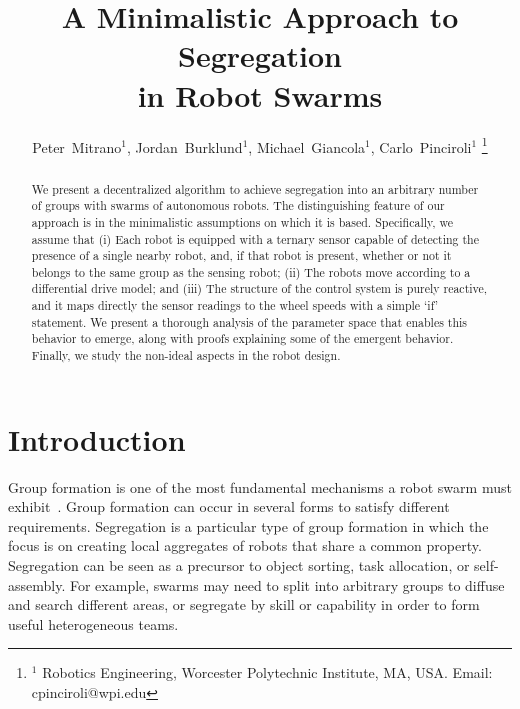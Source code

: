 \documentclass[letterpaper, 10 pt, conference]{ieeeconf}
\begin{document}
\title{\LARGE \bf
A Minimalistic Approach to Segregation\\
in Robot Swarms}

\author{
  Peter~Mitrano$^{1}$,
  Jordan~Burklund$^{1}$,
  Michael~Giancola$^{1}$,
  Carlo~Pinciroli$^{1}$%
  \thanks{$^{1}$ Robotics Engineering, Worcester Polytechnic Institute, MA, USA. Email: {\sf cpinciroli@wpi.edu}}%
}

\maketitle
\thispagestyle{empty}
\pagestyle{empty}

\begin{abstract}
  We present a decentralized algorithm to achieve segregation into an arbitrary
  number of groups with swarms of autonomous robots. The distinguishing feature
  of our approach is in the minimalistic assumptions on which it is
  based. Specifically, we assume that (i) Each robot is equipped with a ternary
  sensor capable of detecting the presence of a single nearby robot, and, if
  that robot is present, whether or not it belongs to the same group as the
  sensing robot; (ii) The robots move according to a differential drive model;
  and (iii) The structure of the control system is purely reactive, and it maps
  directly the sensor readings to the wheel speeds with a simple `if' statement.
  We present a thorough analysis of the parameter space that enables this behavior to emerge,
  along with proofs explaining some of the emergent behavior.
  Finally, we study the non-ideal aspects in the robot design.
\end{abstract}

\section{Introduction}

Group formation is one of the most fundamental mechanisms a robot swarm must
exhibit~\cite{Brambilla2013}. Group formation can occur in several forms to
satisfy different requirements. Segregation is a particular type of group
formation in which the focus is on creating local aggregates of robots that
share a common property. Segregation can be seen as a precursor to object
sorting, task allocation, or self-assembly. For example, swarms may need to
split into arbitrary groups to diffuse and search different areas, or segregate
by skill or capability in order to form useful heterogeneous teams.
\end{document}
